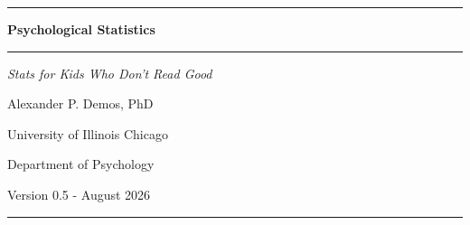 \begin{titlepage}
\thispagestyle{empty}


\begin{flushleft}

\vspace*{1.5cm}

{\color{uicred}\rule{0.85\textwidth}{1.2pt}}

\vspace{1.4cm}

{\sffamily\bfseries\fontsize{44}{52}\selectfont Psychological Statistics\par}

\vspace{0.45cm}

{\color{uicblue}\rule{0.55\textwidth}{0.8pt}}

\vspace{1.2cm}

{\rmfamily\itshape\fontsize{22}{28}\selectfont Stats for Kids Who Don't Read Good\par}

\vspace{2.5cm}

{\sffamily\Large Alexander P. Demos, PhD\par}

\vfill

{\sffamily\large University of Illinois Chicago\par}
\vspace{0.25cm}
{\sffamily\large Department of Psychology\par}
\vspace{0.25cm}
{\sffamily\large Version 0.5 - August 2026\par}

\vspace{1.2cm}

{\color{uicblue}\rule{0.35\textwidth}{4pt}}

\end{flushleft}

\end{titlepage}